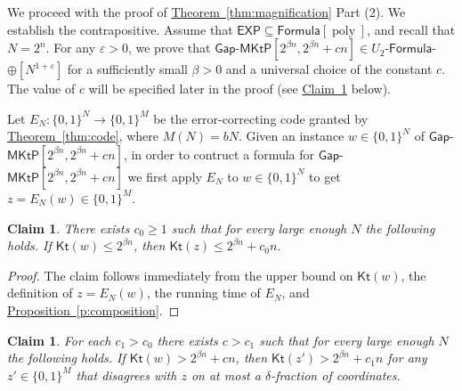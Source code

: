 \documentclass[11pt]{article}
\numberwithin{equation}{section}
\newtheorem{claim}[theorem]{Claim}
\theoremstyle{definition}
\theoremstyle{plain}
\newcommand{\expref}[2]{\hyperref[#2]{#1~\ref{#2}}}
\DeclareMathOperator{\poly}{poly} %
\newcommand{\gapmktp}{\mathsf{Gap}$-$\mathsf{MKtP}}
\newcommand{\Kt}{\mathsf{Kt}}
\begin{document}
We proceed with the proof of \expref{Theorem}{thm:magnification} Part (2). We establish the contrapositive. Assume that $\mathsf{EXP} \subseteq \mathsf{Formula}[\poly]$, and recall that $N = 2^n$. For any  $\varepsilon > 0$, we prove that $\gapmktp[2^{\beta n}, 2^{\beta n} + cn] \in U_2$-$\mathsf{Formula}$-$\oplus[N^{1 + \varepsilon}]$ for a sufficiently small $\beta > 0$ and a universal choice of the constant $c$. The value of $c$ will be specified later in the proof (see \expref{Claim}{cl:Kt2} below).


Let $E_N \colon \{0,1\}^N \to \{0,1\}^M$ be the error-correcting code granted by \expref{Theorem}{thm:code}, where $M(N) = bN$. Given an instance $w \in \{0,1\}^N$ of $\gapmktp[2^{\beta n}, 2^{\beta n} + cn]$, in order to contruct a formula for $\gapmktp[2^{\beta n}, 2^{\beta n} + cn]$ we first apply $E_N$ to $w \in \{0,1\}^N$ to get $z = E_N(w) \in \{0,1\}^M$. 

\begin{claim}\label{cl:Kt1}
There exists $c_0 \geq 1$ such that for every large enough $N$ the following holds.
If $\Kt(w) \leq 2^{\beta n}$, then $\Kt(z) \leq 2^{\beta n} + c_0 n$.
\end{claim}

\begin{proof}
The claim follows immediately from the upper bound on $\Kt(w)$, the definition of $z = E_N(w)$, the running time of $E_N$, and \expref{Proposition}{p:composition}.
\end{proof}

\begin{claim}\label{cl:Kt2}
For each $c_1>c_0$ there exists $c>c_1$ 
such that for every large enough $N$ the following holds.
If $\Kt(w) > 2^{\beta n} + c n$, then $\Kt(z') > 2^{\beta n} + c_1 n$ for any $z' \in \{0,1\}^M$ that disagrees with $z$ on at most a $\delta$-fraction of coordinates.
\end{claim}
\end{document}
